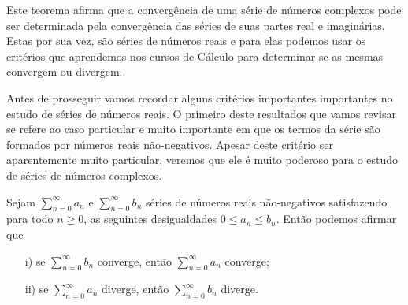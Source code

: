 Este teorema afirma que a convergência de uma série de números complexos pode
ser determinada pela convergência das séries de suas partes real e imaginárias.
Estas por sua vez, são séries de números reais e para elas podemos usar os 
critérios que aprendemos nos cursos de Cálculo para determinar se as mesmas 
convergem ou divergem. 

Antes de prosseguir vamos recordar alguns critérios importantes importantes
no estudo de séries de números reais. O primeiro deste resultados que vamos
revisar se refere ao caso particular e muito importante em que os termos
da série são formados por números reais não-negativos. Apesar deste critério
ser aparentemente muito particular, veremos que ele é muito poderoso para o 
estudo de séries de números complexos. 


\begin{teorema}
\label{teo-teste-comparacao}
Sejam $\sum_{n=0}^{\infty} a_n$ e $\sum_{n=0}^{\infty} b_n$ séries de números 
reais não-negativos satisfazendo para todo $n\geqslant 0$, 
as seguintes desigualdades $0\leqslant a_n\leqslant b_n$.
Então podemos afirmar que 
\begin{itemize}
\item[i)] se $\sum_{n=0}^{\infty} b_n$ converge, então $\sum_{n=0}^{\infty} a_n$ converge;

\item[ii)] se $\sum_{n=0}^{\infty} a_n$ diverge, então $\sum_{n=0}^{\infty} b_n$ diverge.
\end{itemize}
\end{teorema} 

